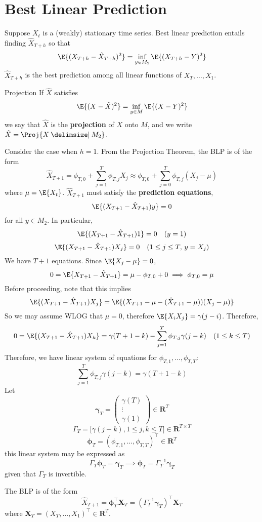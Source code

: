 \section{Best Linear Prediction}
Suppose $ X_t $ is a (weakly) stationary time series.
Best linear prediction entails finding $ \hat{X}_{T+h} $ so that
\[ \E{(X_{T+h}-\hat{X}_{T+h})^2}=\inf_{y\in M_2}\E{(X_{T+h}-Y)^2} \]
$ \hat{X}_{T+h} $ is the best prediction among all linear
functions of $ X_T,\ldots,X_1 $.
\begin{Definition}{Projection}{}
    If $ \hat{X} $ satisfies
    \[ \E{(X-\hat{X})^2}=\inf_{y\in M}\E{(X-Y)^2} \]
    we say that $ \hat{X} $ is the \textbf{projection}
    of $ X $ onto $ M $, and we write $ \hat{X}=\Proj{X\onto M_2} $.
\end{Definition}
Consider the case when $ h=1 $. From the Projection Theorem, the BLP
is of the form
\[ \hat{X}_{T+1}=\phi_{T,0}+\sum_{j=1}^{T} \phi_{T,j}X_j \approx
    \phi_{T,0}+\sum_{j=0}^{T} \phi_{T,j}(X_j-\mu) \]
where $ \mu=\E{X_t} $. $ \hat{X}_{T+1} $ must satisfy
the \textbf{prediction equations},
\[ \E{(X_{T+1}-\hat{X}_{T+1})y}=0 \]
for all $ y\in M_2 $. In particular,
\[ \E{(X_{T+1}-\hat{X}_{T+1})1}=0\quad(y=1) \]
\[ \E{(X_{T+1}-\hat{X}_{T+1})X_j}=0\quad(1\le j\le T,\, y=X_j) \]
We have $ T+1 $ equations. Since $ \E{X_{j}-\mu}=0 $,
\[ 0=\E{X_{T+1}-\hat{X}_{T+1}}=\mu-\phi_{T,0}+0\implies \phi_{T,0}=\mu \]
Before proceeding, note that this implies
\[ \E{(X_{T+1}-\hat{X}_{T+1})X_j}=\E{(X_{T+1}-\mu-(\hat{X}_{T+1}-\mu))(X_{j}-\mu)} \]
So we may assume WLOG that $ \mu=0 $, therefore $ \E{X_i X_j}=\gamma(j-i) $.
Therefore,
\[ 0=\E{(X_{T+1}-\hat{X}_{T+1})X_k}=\gamma(T+1-k)-\sum_{j=1}^{T} \phi_{T,j}\gamma(j-k)\quad(1\le k\le T) \]
Therefore, we have linear system of equations for $ \phi_{T,1},\ldots,\phi_{T,T} $:
\[ \sum_{j=1}^{T}\phi_{T,j}\gamma(j-k)=\gamma(T+1-k)  \]
Let
\[ \symbf{\gamma}_T=\begin{pmatrix}
        \gamma(T) \\
        \vdots    \\
        \gamma(1)
    \end{pmatrix}\in\mathbf{R}^T \]
\[ \Gamma_T=\bigl[\gamma(j-k),1\le j,k\le T\bigr]\in\mathbf{R}^{T\times T} \]
\[ \symbf{\phi}_T=(\phi_{T,1},\ldots,\phi_{T,T})^\top \in\mathbf{R}^T \]
this linear system may be expressed as
\[ \Gamma_T \symbf{\phi}_T=\symbf{\gamma}_T\implies \symbf{\phi}_T=\Gamma_T^{-1}\symbf{\gamma}_T \]
given that $ \Gamma_T $ is invertible.

The BLP is of the form
\[ \hat{X}_{T+1}=\symbf{\phi}_T^\top \symbf{X}_T=(\Gamma_T^{-1}\symbf{\gamma}_T)^\top \symbf{X}_T \]
where $ \symbf{X}_T=(X_{T},\ldots,X_1)^\top\in \mathbf{R}^T $.

